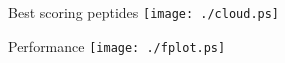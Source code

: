 \documentclass{prosper}
\begin{document}
\begin{slide}{Best scoring peptides}
\texttt{[image: ./cloud.ps]}
\end{slide}
\begin{slide}{Performance}
\texttt{[image: ./fplot.ps]}
\end{slide}
\end{document}
